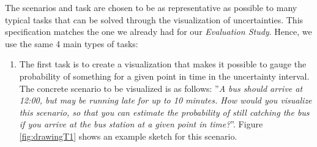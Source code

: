 The scenarios and task are chosen to be as representative as possible to many typical tasks that can be solved through the visualization of uncertainties. This specification matches the one we already had for our \textit{Evaluation Study}. Hence, we use the same 4 main types of tasks:
\begin{enumerate}
	\item The first task is to create a visualization that makes it possible to gauge the probability of something for a given point in time in the uncertainty interval. The concrete scenario to be visualized is as follows: ''\textit{A bus should arrive at 12:00, but may be running late for up to 10 minutes. How would you visualize this scenario, so that you can estimate the probability of still catching the bus if you arrive at the bus station at a given point in time?}''. Figure \ref{fig:drawingT1} shows an example sketch for this scenario.
	

\end{enumerate}
